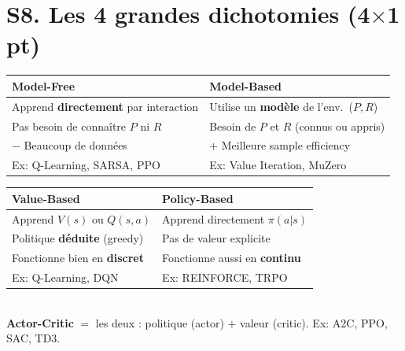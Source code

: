 \documentclass[11pt,a4paper]{article}
\begin{document}
\section[S8. Les 4 grandes dichotomies (4x1 pt)]{S8. Les 4 grandes dichotomies (4$\times$1 pt)}

\begin{formbox}
\renewcommand{\arraystretch}{1.2}
\begin{tabular}{@{}p{6.5cm} p{6.5cm}@{}}
\toprule
\textbf{Model-Free} & \textbf{Model-Based} \\
\midrule
Apprend \textbf{directement} par interaction & Utilise un \textbf{modèle} de l'env.\ ($P, R$) \\
Pas besoin de connaître $P$ ni $R$ & Besoin de $P$ et $R$ (connus ou appris) \\
$-$ Beaucoup de données & $+$ Meilleure sample efficiency \\
Ex: Q-Learning, SARSA, PPO & Ex: Value Iteration, MuZero \\
\bottomrule
\end{tabular}
\end{formbox}

\begin{formbox}
\renewcommand{\arraystretch}{1.2}
\begin{tabular}{@{}p{6.5cm} p{6.5cm}@{}}
\toprule
\textbf{Value-Based} & \textbf{Policy-Based} \\
\midrule
Apprend $V(s)$ ou $Q(s,a)$ & Apprend directement $\pi(a|s)$ \\
Politique \textbf{déduite} (greedy) & Pas de valeur explicite \\
Fonctionne bien en \textbf{discret} & Fonctionne aussi en \textbf{continu} \\
Ex: Q-Learning, DQN & Ex: REINFORCE, TRPO \\
\bottomrule
\end{tabular}\\[4pt]
\textbf{Actor-Critic} $=$ les deux : politique (actor) $+$ valeur (critic). Ex: A2C, PPO, SAC, TD3.
\end{formbox}
\end{document}
